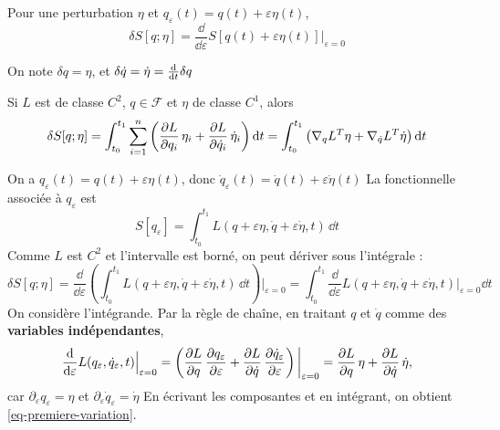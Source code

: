 \begin{definition}
    Pour une perturbation $\eta$ et $q_\varepsilon (t) = q(t) + \varepsilon\eta(t)$,
    \[
        \delta S[q;\eta]
        = \frac{\dd}{\dd\varepsilon}
        S[q(t) + \varepsilon\eta(t)]\Big|_{\varepsilon=0}
    \]
\end{definition}

On note $\delta q = \eta$, et $\delta\dot q = \dot\eta = \frac{\mathrm{d}}{\mathrm{d} t}\delta q$

\begin{proposition}
    Si $L$ est de classe $C^2$, $q\in\mathcal{F}$ et $\eta$ de classe
    $C^1$, alors
    \begin{equation}\label{eq-premiere-variation}
        \delta S[q;\eta]
        = \int_{t_0}^{t_1}\sum_{i=1}^{n}
        \left(\frac{\partial L}{\partial q_i}\,\eta_i + \frac{\partial L}{\partial \dot q_i}\,\dot\eta_i\right)
        \mathrm{d} t
        = \int_{t_0}^{t_1}
        \left(\nabla_q L^T\eta + \nabla_{\dot q} L^T\dot\eta\right)
        \mathrm{d} t
    \end{equation}
\end{proposition}

\begin{demonstration}
    On a $q_\varepsilon(t) = q(t) + \varepsilon\eta(t)$, donc
    $\dot q_\varepsilon(t) = \dot q(t) + \varepsilon\dot\eta(t)$ La
    fonctionnelle associée à $q_\varepsilon$ est
    \[
        S[q_\varepsilon] = \int_{t_0}^{t_1}
        L(q+\varepsilon\eta,\dot q+\varepsilon\dot\eta,t)\,\dd t
    \]
    Comme $L$ est $C^2$ et l'intervalle est borné, on peut dériver
    sous l'intégrale :
    \[
        \delta S[q;\eta]
        = \frac{\dd}{\dd\varepsilon}\left(\int_{t_0}^{t_1}
        L(q+\varepsilon\eta,\dot q+\varepsilon\dot\eta,t)\,\dd t\right)
        \bigg|_{\varepsilon=0}
        = \int_{t_0}^{t_1}\frac{\dd}{\dd\varepsilon}
        L(q+\varepsilon\eta,\dot q+\varepsilon\dot\eta,t)
        \Big|_{\varepsilon=0}\dd t
    \]
    On considère l'intégrande. Par la règle de chaîne, en traitant $q$
    et $\dot q$ comme des \textbf{variables indépendantes},
    \[
        \frac{\mathrm{d}}{\mathrm{d}\varepsilon}L(q_\varepsilon,\dot q_\varepsilon,t)
        \Big|_{\varepsilon=0}
        = \left(\frac{\partial L}{\partial q}\,\frac{\partial q_\varepsilon}{\partial \varepsilon}
        + \frac{\partial L}{\partial \dot q}\,\frac{\partial \dot q_\varepsilon}{\partial \varepsilon}\right)
        \bigg|_{\varepsilon=0}
        = \frac{\partial L}{\partial q}\,\eta + \frac{\partial L}{\partial \dot q}\,\dot\eta,
    \]
    car $\partial_\varepsilon q_\varepsilon = \eta$ et
    $\partial_\varepsilon\dot q_\varepsilon = \dot\eta$ En écrivant
    les composantes et en intégrant, on obtient
    \eqref{eq-premiere-variation}.
\end{demonstration}


